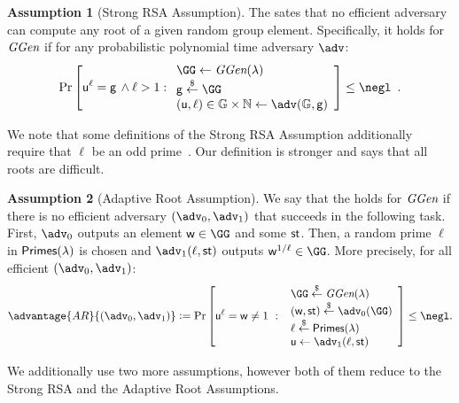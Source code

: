 \documentclass{article}
\theoremstyle{definition}
\newtheorem{assumption}{Assumption}
\begin{document}
\begin{assumption}[Strong RSA Assumption]


\label{assum:strongRSA}
The  sates that no efficient adversary can compute any root of a given random group element. Specifically, it holds for $\textit{GGen}$ if for any probabilistic polynomial time adversary $\adv$:
\[
    \Pr\left[\gr{u}^\ell = \gr{g} \,\wedge \ell>1:
    \begin{array}{l}
         \GG \leftarrow \ggen(\lambda)  \\
         \gr{g} \sample \GG \\
         (\gr{u}, \ell) \in \mathbb{G} \times \mathbb{N} \leftarrow \adv(\mathbb{G}, \gr{g}) \\
    \end{array}\right] \leq \negl \enspace .
\]
\end{assumption} 
We note that some definitions of the Strong RSA Assumption additionally require that $\ell$ be an odd prime~\cite{EC:BarPfi97}. Our definition is stronger and says that all roots are difficult.
\begin{assumption}[Adaptive Root Assumption]
\label{assum:adaptiveroot}
We say that the  holds for $\textit{GGen}$ if 
there is no efficient adversary $(\adv_0,\adv_1)$ that succeeds 
in the following task.
First, $\adv_0$ outputs an element $\gr{w} \in \GG$ and some $\textsf{st}$.
Then, a random prime $\ell$ in $\textsf{Primes}(\lambda)$ is chosen
and $\adv_1(\ell,\state)$ outputs $\gr{w}^{1/\ell} \in \GG$.
More precisely, for all efficient $(\adv_0,\adv_1)$:
\[           \advantage{AR}{(\adv_0,\adv_1)}\deq 
                \Pr\left[\gr{u}^\ell = \gr{w} \neq 1 \ : \ 
                \begin{array}{l}
                      \GG \sample \ggen(\lambda) \\ 
                      (\gr{w},\state) \sample \adv_0(\GG) \\
                      \ell \sample \primes \\ 
                      \gr{u} \gets \adv_1(\ell, \state)
                \end{array} 
        \right] \leq \negl.
\]
\end{assumption}







We additionally use two more assumptions, however both of them reduce to the Strong RSA and the Adaptive Root Assumptions.
\end{document}
